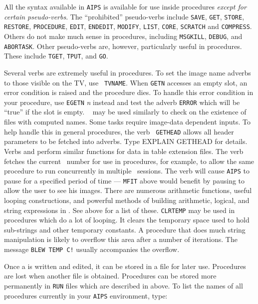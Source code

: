     All the syntax available in {\tt AIPS} is available for use
inside procedures {\it except for certain pseudo-verbs}.  The
``prohibited'' pseudo-verbs include {\tt SAVE}, {\tt GET}, {\tt STORE},
{\tt RESTORE}, {\tt PROCEDURE}, {\tt EDIT}, {\tt ENDEDIT}, {\tt MODIFY},
{\tt LIST}, {\tt CORE}, {\tt SCRATCH} and \hbox{{\tt COMPRESS}}.
Others do not make much sense in procedures, including {\tt MSGKILL},
{\tt DEBUG}, and \hbox{{\tt ABORTASK}}.  Other pseudo-verbs are,
however, particularly useful in procedures.  These include {\tt TGET},
{\tt TPUT}, and \hbox{{\tt GO}}.

     Several verbs are extremely useful in procedures.  To set the
image name adverbs to those visible on the TV, use \hbox{{\tt
TVNAME}}.  When {\tt GETN} accesses an empty slot, an error condition
is raised and the procedure dies.  To handle this error condition in
your procedure, use {\tt EGETN} {\it n\/} instead and test the adverb
{\tt ERROR} which will be ``true'' if the slot is empty.  {\tt
{}} may be used similarly to check on the existence of
files with computed names.  Some tasks require image-data dependent
inputs.  To help handle this in general procedures, the verb {\tt
GETHEAD} allows all header parameters to be fetched into adverbs. Type
{\us EXPLAIN GETHEAD \CR} for details.  Verbs {\tt {}}
and {\tt {}} perform similar functions for data in table
extension files.  The verb {\tt {}} fetches the current
\POPS\ number for use in procedures, for example, to allow the same
procedure to run concurrently in multiple \AIPS\ sessions.   The verb
{\tt {}} will cause {\tt AIPS} to pause for a specified
period of time --- {\tt MFIT} above would benefit by pausing to allow
the user to see his images.  There are numerous arithmetic functions,
useful looping constructions, and powerful methods of building
arithmetic, logical, and string expressions in \hbox{\POPS}.  See
 above for a list of these. {\tt CLRTEMP} may be used in
procedures which do a lot of looping.  It clears the temporary space
used to hold sub-strings and other temporary constants. A procedure
that does much string manipulation is likely to overflow this area
after a number of iterations.  The message {\tt BLEW TEMP C!} usually
accompanies the overflow.

     Once a  is written and edited, it can be stored
in a {\tt {}} file for later use.  Procedures are lost when
another {\tt {}} file is obtained.  Procedures can be stored
more permanently in {\tt RUN} files which are described in
 above.  To list the names of all procedures currently in
your {\tt AIPS} environment, type:

